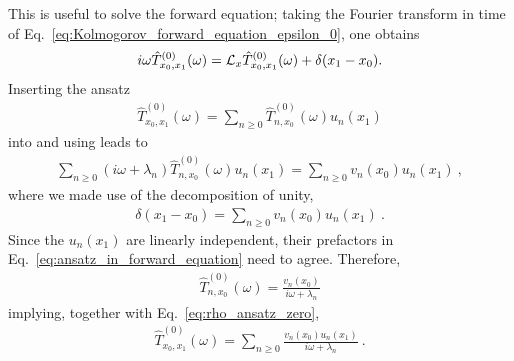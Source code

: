 \documentclass[%
 reprint,
superscriptaddress,
nofootinbib,
 amsmath,amssymb,
 aps,
prx,
]{revtex4-2}
\begin{document}
This is useful to solve the forward equation; taking the Fourier transform in time of Eq.~\eqref{eq:Kolmogorov_forward_equation_epsilon_0}, one obtains
\begin{align}
	 i\omega \hat{T}^{(0)}_{x_0,x_1}(\omega) = \mathcal{L}_x\hat{T}^{(0)}_{x_0,x_1}(\omega)+ \delta(x_1 - x_0).
	\label{eq:laplace_trafo_forward}
\end{align}
Inserting the ansatz
\begin{align}
\hat{T}^{(0)}_{x_0,x_1}(\omega)= \sum_{n \geq 0}^{} \hat{T}^{(0)}_{n, x_0}(\omega) u_n(x_1)
	\label{eq:rho_ansatz_zero}
\end{align}
 into  and using  leads to
\begin{align}
	\sum_{n \geq 0}^{}(
i\omega + \lambda_n)\hat{T}^{(0)}_{n, x_0}(\omega) u_n(x_1) = \sum_{n \geq 0}^{} v_n(x_0) u_n(x_1)~,
	\label{eq:ansatz_in_forward_equation}
\end{align}
where we made use of the decomposition of unity,
\begin{align}
	\delta(x_1-x_0) = \sum_{n \geq 0}^{} v_n(x_0)u_n(x_1)~. 
	\label{}
\end{align}
Since the $u_n(x_1)$ are linearly independent, their prefactors in Eq.~\eqref{eq:ansatz_in_forward_equation} need to agree. Therefore,
\begin{align}
	\hat{T}^{(0)}_{n, x_0}(\omega)= \frac{v_n(x_0)}{i\omega+\lambda_n}
	\label{}
\end{align}
implying, together with Eq.~\eqref{eq:rho_ansatz_zero},
\begin{align}
	\hat{T}^{(0)}_{x_0,x_1}(\omega)=\sum_{n \geq 0}^{} \frac{v_n(x_0)u_n(x_1)}{i\omega+\lambda_n}~.
	\label{eq:rho_zero_order_result}
\end{align}
\end{document}
